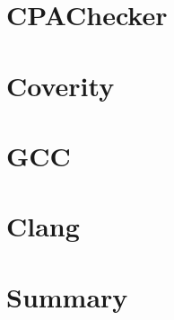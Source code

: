 \section{CPAChecker}\label{chap:results:cpachecker}

\section{Coverity}\label{chap:results:coverity}

\section{GCC}\label{chap:results:gcc}


\section{Clang}\label{chap:results:clang}

\section{Summary}\label{chap:results:summary}

